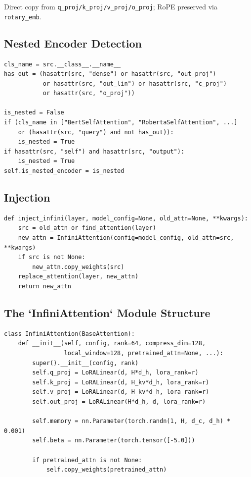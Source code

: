 Direct copy from \texttt{q\_proj/k\_proj/v\_proj/o\_proj}; RoPE preserved via 
\texttt{rotary\_emb}.

\subsection{Nested Encoder Detection}

\begin{lstlisting}
cls_name = src.__class__.__name__
has_out = (hasattr(src, "dense") or hasattr(src, "out_proj")
           or hasattr(src, "out_lin") or hasattr(src, "c_proj")
           or hasattr(src, "o_proj"))

is_nested = False
if (cls_name in ["BertSelfAttention", "RobertaSelfAttention", ...]
    or (hasattr(src, "query") and not has_out)):
    is_nested = True
if hasattr(src, "self") and hasattr(src, "output"):
    is_nested = True
self.is_nested_encoder = is_nested
\end{lstlisting}

\subsection{Injection}

\begin{lstlisting}
def inject_infini(layer, model_config=None, old_attn=None, **kwargs):
    src = old_attn or find_attention(layer)
    new_attn = InfiniAttention(config=model_config, old_attn=src, **kwargs)
    if src is not None:
        new_attn.copy_weights(src)
    replace_attention(layer, new_attn)
    return new_attn
\end{lstlisting}

\subsection{The `InfiniAttention` Module Structure}

\begin{lstlisting}
class InfiniAttention(BaseAttention):
    def __init__(self, config, rank=64, compress_dim=128,
                 local_window=128, pretrained_attn=None, ...):
        super().__init__(config, rank)
        self.q_proj = LoRALinear(d, H*d_h, lora_rank=r)
        self.k_proj = LoRALinear(d, H_kv*d_h, lora_rank=r)
        self.v_proj = LoRALinear(d, H_kv*d_h, lora_rank=r)
        self.out_proj = LoRALinear(H*d_h, d, lora_rank=r)
        
        self.memory = nn.Parameter(torch.randn(1, H, d_c, d_h) * 0.001)
        self.beta = nn.Parameter(torch.tensor([-5.0]))
        
        if pretrained_attn is not None:
            self.copy_weights(pretrained_attn)
\end{lstlisting}

